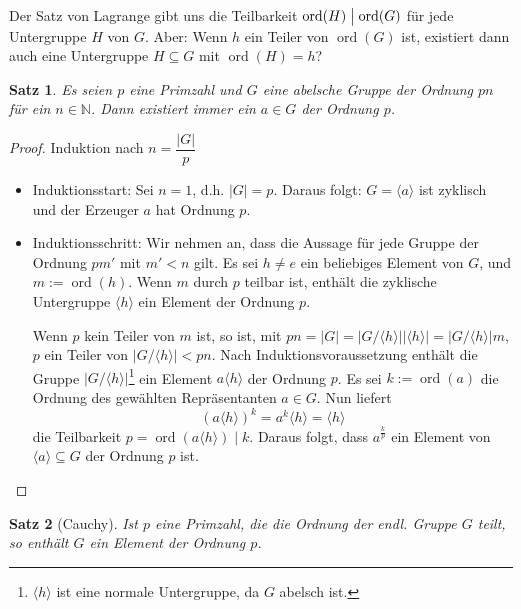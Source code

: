\documentclass[12pt]{scrartcl} %
\DeclareMathOperator{\ord}{ord}
\newcommand{\divides}{\mathrel{\bigm|}}
\newtheorem{thm}{Satz}
\theoremstyle{definition}
\theoremstyle{remark}
\begin{document}
Der Satz von Lagrange gibt uns die Teilbarkeit $\ord(H) \divides \ord(G)$ für jede Untergruppe $H$ von $G$.
Aber: Wenn \(h\) ein Teiler von $\ord(G)$ ist, existiert dann auch eine Untergruppe \(H \subseteq G\) mit $\ord(H)=h$?

\begin{thm}
	Es seien $p$ eine Primzahl und $G$ eine abelsche Gruppe der Ordnung $pn$ für ein $n\in\mathbb{N}$.
	Dann existiert immer ein $a \in G$ der Ordnung $p$.
\end{thm}

\begin{proof}
	Induktion nach $n=\dfrac{|G|}{p}$
	\begin{itemize}
	\item Induktionsstart: Sei \(n=1\), d.h. $|G|=p$.
		Daraus folgt: $G=\langle a\rangle$ ist zyklisch und der Erzeuger \(a\) hat Ordnung \(p\).
	\item Induktionsschritt: Wir nehmen an, dass die Aussage für jede Gruppe der Ordnung $pm'$ mit $m'<n$ gilt.
		Es sei $h\neq e$ ein beliebiges Element von \(G\), und $m:=\ord(h)$.
		Wenn \(m\) durch \(p\) teilbar ist, enthält die zyklische Untergruppe $\langle h\rangle$ ein Element der Ordnung \(p\).

		Wenn \(p\) kein Teiler von \(m\) ist, so ist, mit \(pn = |G| = |G/\langle h\rangle||\langle h\rangle| = |G/\langle h\rangle|m\), \(p\) ein Teiler von $|G/\langle h\rangle|<pn$.
		Nach Induktionsvoraussetzung enthält die Gruppe $|G/\langle h\rangle|$\footnote{\(\langle h\rangle\) ist eine normale Untergruppe, da \(G\) abelsch ist.} ein Element $a\langle h\rangle$ der Ordnung \(p\).
		Es sei $k:=\ord(a)$ die Ordnung des gewählten Repräsentanten $a \in G$.
		Nun liefert \[(a\langle h\rangle)^k=a^k\langle h\rangle=\langle h\rangle\] die Teilbarkeit \(p = \ord(a\langle h\rangle) \mid k\).
		Daraus folgt, dass $a^{\frac{k}{p}}$ ein Element von $\langle a\rangle \subseteq G$ der Ordnung \(p\) ist.\qedhere
	\end{itemize}
\end{proof}

\begin{thm}[Cauchy]
	Ist \(p\) eine Primzahl, die die Ordnung der endl. Gruppe \(G\) teilt, so enthält \(G\) ein Element der Ordnung \(p\).
\end{thm}
\end{document}
